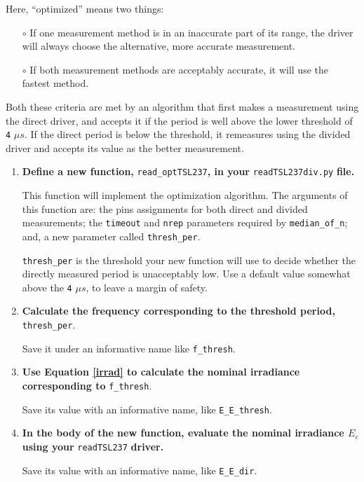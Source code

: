 {Here, ``optimized'' means two things:
\begin{itemize}
	\item[$\circ$] If one measurement method is in an inaccurate part of its range, the driver will always choose the alternative, more accurate measurement.
	\item[$\circ$] If both measurement methods are acceptably accurate, it will use the fastest method.
\end{itemize}
Both these criteria are met by an algorithm that first makes a measurement using the direct driver, and accepts it if the period is well above the lower threshold of \texttt{4} $\mu s$.
If the direct period is below the threshold, it remeasures using the divided driver and accepts its value as the better measurement.
\begin{enumerate}
	\item \textbf{Define a new function,} \lstinline{read_optTSL237}\textbf{, in your} \lstinline{readTSL237div.py} \textbf{file.}

	This function will implement the optimization algorithm.
	The arguments of this function are: the pins assignments for both direct and divided measurements; the \lstinline{timeout} and \lstinline{nrep} parameters required by \lstinline{median_of_n}; and, a new parameter called \lstinline{thresh_per}.

	\smallskip
	\lstinline{thresh_per} is the threshold your new function will use to decide whether the directly measured period is unacceptably low.
	Use a default value somewhat above the  \texttt{4} $\mu s$, to leave a margin of safety.

	\item \textbf{Calculate the frequency corresponding to the threshold period,} \lstinline{thresh_per}.

	Save it under an informative name like \lstinline{f_thresh}.

	\item \textbf{Use Equation \ref{irrad} to calculate the nominal irradiance corresponding to} \lstinline{f_thresh}.

	Save its value with an informative name, like \lstinline{E_E_thresh}.

	\item \textbf{In the body of the new function, evaluate the nominal irradiance $E_e$ using your} \lstinline{readTSL237} \textbf{driver.}

	Save its value with an informative name, like \lstinline{E_E_dir}.


\end{enumerate}}
